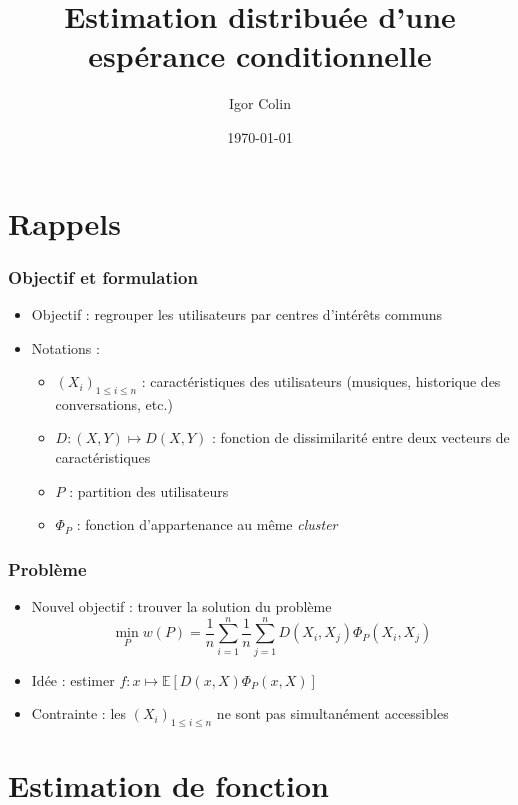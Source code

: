 \documentclass[c]{beamer}
\title{Estimation distribu\'ee d'une esp\'erance conditionnelle}
\author{Igor Colin}
\date{\today}
\begin{document}
\begin{frame}
  \maketitle
\end{frame}

\section{Rappels}

\begin{frame}
  \frametitle{Objectif et formulation}

  \begin{itemize}
    \item Objectif : regrouper les utilisateurs par centres d'int\'erêts communs
    \item Notations :
      \begin{itemize}
        \item $(X_i)_{1 \leq i \leq n}$ : caract\'eristiques des utilisateurs (musiques,
          historique des conversations, etc.)
        \item $D : (X, Y) \mapsto D(X, Y)$ : fonction de dissimilarit\'e entre deux
          vecteurs de caract\'eristiques
        \item $P$ : partition des utilisateurs
        \item $\Phi_P$ : fonction d'appartenance au même \emph{cluster}
      \end{itemize}
  \end{itemize}
\end{frame}

\begin{frame}
  \frametitle{Probl\`eme}

  \begin{itemize}
    \item Nouvel objectif : trouver la solution du probl\`eme
      \[
      \min_P w(P) = \frac{1}{n} \sum_{i =1}^n \frac{1}{n} \sum_{j=1}^{n} D(X_i, X_j) \Phi_P(X_i, X_j)
      \]
    \item Id\'ee : estimer $f : x \mapsto \mathbb{E}[D(x, X) \Phi_P(x, X)]$
    \item Contrainte : les $(X_i)_{1 \leq i \leq n}$ ne sont pas simultan\'ement accessibles
  \end{itemize}
\end{frame}

\section{Estimation de fonction}
\end{document}
